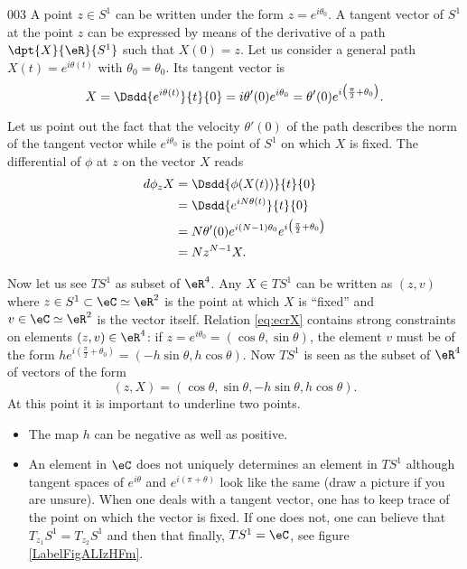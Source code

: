 \begin{corrige}{003}
A point $z\in S^1$ can be written under the form $z=e^{i\theta_0}$. A tangent vector of $S^1$ at the point $z$ can be expressed by means of the derivative of a path $\dpt{ X }{ \eR }{ S^1 }$ such that $X(0)=z$. Let us consider a general path $X(t)=e^{i\theta(t)}$ with $\theta_0=\theta_0$. Its tangent vector is
\begin{equation} \label{eq:ecrX}
  X=\Dsdd{ e^{i\theta(t)} }{t}{0}=i\theta'(0)e^{i\theta_0}=\theta'(0)e^{i\big( \frac{ \pi }{ 2 }+\theta_0 \big)}.
 \end{equation}

Let us point out the fact that the velocity $\theta'(0)$ of the path describes the norm of the tangent vector while $e^{i\theta_0}$ is the point of $S^1$ on which $X$ is fixed. The differential of $\phi$ at $z$ on the vector $X$ reads
\begin{equation}  \label{eq:dphiz}
\begin{split}
d\phi_zX&=\Dsdd{ \phi(X(t)) }{t}{0}\\
		&=\Dsdd{ e^{iN\theta(t)} }{t}{0}\\
		&=N\theta'(0)e^{i(N-1)\theta_0}e^{i\big( \frac{ \pi }{ 2 }+\theta_0 \big)}\\
		&=Nz^{N-1}X.
\end{split}
\end{equation}

Now let us see $TS^1$ as subset of $\eR^4$. Any $X\in TS^1$ can be written as $(z,v)$ where $z\in S^1\subset\eC\simeq\eR^2$ is the point at which $X$ is ``fixed'' and $v\in \eC\simeq\eR^2$ is the vector itself. Relation \eqref{eq:ecrX} contains strong constraints on elements $(z,v)\in\eR^4$: if $z=e^{i\theta_0}=(\cos \theta,\sin\theta)$, the element $v$ must be of the form $he^{i\left( \frac{ \pi }{ 2 }+\theta_0 \right)}=(-h\sin\theta,h\cos\theta)$. Now $TS^1$ is seen as the subset of $\eR^4$ of vectors of the form
\[ 
  (z,X)=(\cos\theta,\sin\theta,-h\sin\theta,h\cos\theta).
\]
At this point it is important to underline two points.
\begin{itemize}
\item The map $h$ can be negative as well as positive.
\item An element in $\eC$ does not uniquely determines an element in $TS^1$ although tangent spaces of $e^{i\theta}$ and $e^{i(\pi+\theta)}$ look like the same (draw a picture if you are unsure). When one deals with a tangent vector, one has to keep trace of the point on which the vector is fixed. If one does not, one can believe that $T_{z_1}S^1=T_{z_2}S^1$ and then that finally, $TS^1=\eC$, see figure \ref{LabelFigALIzHFm}.
\end{itemize}



\end{corrige}
